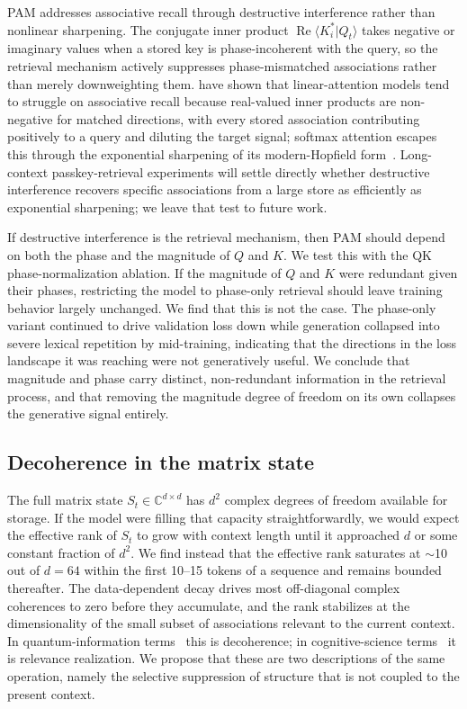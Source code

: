 \documentclass[aps,prl,twocolumn,superscriptaddress,amsmath,amssymb]{revtex4-2}
\newcommand{\Complex}{\mathbb{C}}
\newcommand{\Repart}{\operatorname{Re}}
\begin{document}
PAM addresses associative recall through destructive interference rather than nonlinear sharpening. The conjugate inner product $\Repart\langle K_i^* | Q_t\rangle$ takes negative or imaginary values when a stored key is phase-incoherent with the query, so the retrieval mechanism actively suppresses phase-mismatched associations rather than merely downweighting them. \citet{arora2024based} have shown that linear-attention models tend to struggle on associative recall because real-valued inner products are non-negative for matched directions, with every stored association contributing positively to a query and diluting the target signal; softmax attention escapes this through the exponential sharpening of its modern-Hopfield form~\cite{ramsauer2021hopfield}. Long-context passkey-retrieval experiments will settle directly whether destructive interference recovers specific associations from a large store as efficiently as exponential sharpening; we leave that test to future work.

If destructive interference is the retrieval mechanism, then PAM should depend on both the phase and the magnitude of $Q$ and $K$. We test this with the QK phase-normalization ablation. If the magnitude of $Q$ and $K$ were redundant given their phases, restricting the model to phase-only retrieval should leave training behavior largely unchanged. We find that this is not the case. The phase-only variant continued to drive validation loss down while generation collapsed into severe lexical repetition by mid-training, indicating that the directions in the loss landscape it was reaching were not generatively useful. We conclude that magnitude and phase carry distinct, non-redundant information in the retrieval process, and that removing the magnitude degree of freedom on its own collapses the generative signal entirely.

\subsection{Decoherence in the matrix state}
\label{sec:dis_decoherence}

The full matrix state $S_t \in \Complex^{d \times d}$ has $d^2$ complex degrees of freedom available for storage. If the model were filling that capacity straightforwardly, we would expect the effective rank of $S_t$ to grow with context length until it approached $d$ or some constant fraction of $d^2$. We find instead that the effective rank saturates at $\sim$10 out of $d = 64$ within the first 10--15 tokens of a sequence and remains bounded thereafter. The data-dependent decay drives most off-diagonal complex coherences to zero before they accumulate, and the rank stabilizes at the dimensionality of the small subset of associations relevant to the current context. In quantum-information terms~\cite{zurek2003decoherence} this is decoherence; in cognitive-science terms~\cite{vervaeke2013} it is relevance realization. We propose that these are two descriptions of the same operation, namely the selective suppression of structure that is not coupled to the present context.
\end{document}
